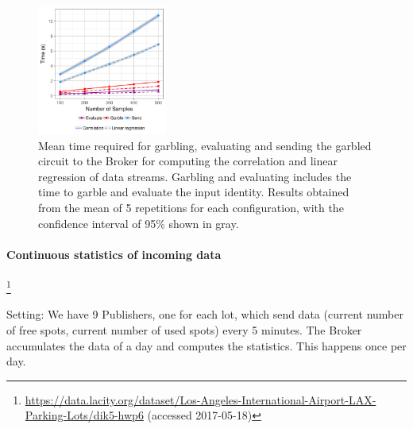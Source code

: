 \begin{figure}
  \includegraphics[width=0.38\textwidth]{plots/stream.png}
  \caption{Mean time required for garbling, evaluating and sending the garbled
    circuit to the Broker for computing the correlation and linear regression
    of data streams.  Garbling and evaluating includes the time to garble and
    evaluate the input identity.  Results obtained from the mean of 5
    repetitions for each configuration, with the confidence interval of 95\%
    shown in gray.}
  \label{stream-times}
\end{figure}

\paragraph{Continuous statistics of incoming data}

\footnote{\url{https://data.lacity.org/dataset/Los-Angeles-International-Airport-LAX-Parking-Lots/dik5-hwp6} (accessed 2017-05-18)}



Setting: We have 9 Publishers, one for each lot, which send data (current
number of free spots, current number of used spots) every 5 minutes.  The
Broker accumulates the data of a day and computes the statistics.  This
happens once per day.


